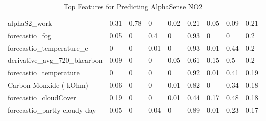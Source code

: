 \begin{table}[H]
\begin{tabular}{lllllllll}
alphaS2\_work                     & 0.31  & 0.78  & 0          & 0.02 & 0.21 & 0.05  & 0.09      & 0.21 \\
forecastio\_fog                   & 0.05  & 0     & 0.4        & 0    & 0.93 & 0     & 0         & 0.2  \\
forecastio\_temperature\_c        & 0     & 0     & 0.01       & 0    & 0.93 & 0.01  & 0.44      & 0.2  \\
derivative\_avg\_720\_bkcarbon    & 0.09  & 0     & 0          & 0.05 & 0.61 & 0.15  & 0.5       & 0.2  \\
forecastio\_temperature           & 0     & 0     & 0          & 0    & 0.92 & 0.01  & 0.41      & 0.19 \\
Carbon Monxide ( kOhm)            & 0.06  & 0     & 0          & 0.01 & 0.82 & 0     & 0.34      & 0.18 \\
forecastio\_cloudCover            & 0.19  & 0     & 0          & 0.01 & 0.44 & 0.17  & 0.48      & 0.18 \\
forecastio\_partly-cloudy-day     & 0.05  & 0     & 0.04       & 0    & 0.89 & 0.01  & 0.23      & 0.17 \\
\bottomrule
\end{tabular}
\label{tab:as_no2_top_features}
\caption{Top Features for Predicting AlphaSense NO2}
\end{table}

